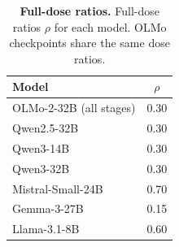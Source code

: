 \begin{table}[!h]
\centering
\small
\begin{tabular}{@{}lc@{}}
\toprule
Model & $\rho$ \\
\midrule
OLMo-2-32B (all stages) & 0.30 \\
Qwen2.5-32B & 0.30 \\
Qwen3-14B & 0.30 \\
Qwen3-32B & 0.30 \\
Mistral-Small-24B & 0.70 \\
Gemma-3-27B & 0.15 \\
Llama-3.1-8B & 0.60 \\
\bottomrule
\end{tabular}
\vspace{4pt}
\caption{\textbf{Full-dose ratios.} Full-dose ratios $\rho$ for each model. OLMo checkpoints share the same dose ratios.}
\label{tab:dose_calibration}
\end{table}
